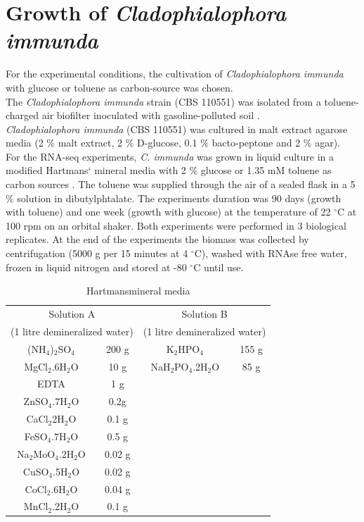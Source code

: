 \documentclass[12pt, a4paper]{report}
\begin{document}
\section{Growth of \textit{Cladophialophora immunda}}
For the experimental conditions, the cultivation of \textit{Cladophialophora immunda} with glucose or toluene as carbon-source was chosen. \\
The \textit{Cladophialophora immunda} strain (CBS 110551) was isolated from a toluene-charged air biofilter inoculated with gasoline-polluted soil \cite{Prenafeta-Boldu2001}.  \\
\textit{Cladophialophora immunda} (CBS 110551) was cultured in malt extract agarose media (2 $\%$ malt extract, 2 $\%$ D-glucose, 0.1 $\%$ bacto-peptone and 2 $\%$ agar). \\
For the RNA-seq experiments, \textit{C. immunda} was grown in liquid culture in a modified Hartmans` mineral media with 2 $\%$ glucose or 1.35 mM toluene as carbon sources \cite{Hartmans1991}. The toluene was supplied through the air of a sealed flask in a 5 $\%$ solution in dibutylphtalate. The experiments duration was 90 days (growth with toluene) and one week (growth with glucose) at the temperature of 22 $^\circ$C at 100 rpm on an orbital shaker. Both experiments were performed in 3 biological replicates. At the end of the experiments the biomass was collected by centrifugation (5000 g per 15 minutes at 4 $^\circ$C), washed with RNAse free water, frozen in liquid nitrogen and stored at -80 $^\circ$C until use. \\

\begin{table}[h]
	\centering
	\begin{tabular}{c c | c c}
		\multicolumn{2}{c|}{Solution A} & \multicolumn{2}{c}{Solution B}  \\
		\multicolumn{2}{c|}{(1 litre demineralized water)}  & \multicolumn{2}{c}{(1 litre demineralized water)} \\
		\hline
		(NH$_4$)$_2$SO$_4$ & 200 g & K$_2$HPO$_4$ & 155 g\\
		MgCl$_2$.6H$_2$O & 10 g & NaH$_2$PO$_4$.2H$_2$O & 85 g \\
		EDTA & 1 g & &  \\
		ZnSO$_4$.7H$_2$O & 0.2g & & \\
		CaCl$_2$2H$_2$O & 0.1 g & & \\
		FeSO$_4$.7H$_2$O & 0.5 g & & \\
		Na$_2$MoO$_4$.2H$_2$O & 0.02 g & &\\                                
		CuSO$_4$.5H$_2$O & 0.02 g & & \\
		CoCl$_2$.6H$_2$O & 0.04 g & & \\
		MnCl$_2$.2H$_2$O & 0.1 g & & \\                          
	\end{tabular}
	\caption{Hartmans\textquotesingle mineral media}
\end{table}
\end{document}

